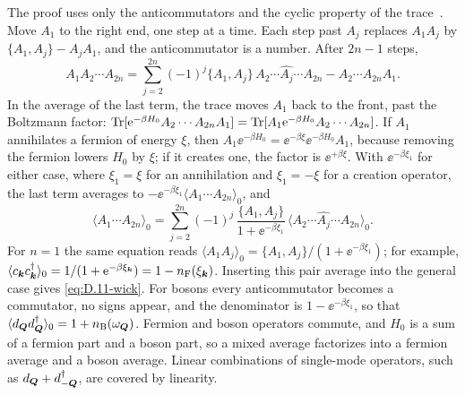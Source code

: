 The proof uses only the anticommutators and the cyclic property of the trace~\cite{gaudin1960demonstration}. Move $A_1$ to the right end, one step at a time. Each step past $A_j$ replaces $A_1A_j$ by $\{A_1, A_j\} - A_jA_1$, and the anticommutator is a number. After $2n - 1$ steps,
\begin{equation*}
  A_1A_2\cdots A_{2n} = \sum_{j=2}^{2n}(-1)^j\{A_1, A_j\}\,A_2\cdots\widehat{A_j}\cdots A_{2n} - A_2\cdots A_{2n}A_1 .
\end{equation*}
In the average of the last term, the trace moves $A_1$ back to the front, past the Boltzmann factor: $\operatorname{Tr}[\mathrm{e}^{-\beta H_0}A_2\cdots A_{2n}A_1] = \operatorname{Tr}[A_1\mathrm{e}^{-\beta H_0}A_2\cdots A_{2n}]$. If $A_1$ annihilates a fermion of energy $\xi$, then $A_1\ee^{-\beta H_0} = \ee^{-\beta\xi}\ee^{-\beta H_0}A_1$, because removing the fermion lowers $H_0$ by $\xi$; if it creates one, the factor is $\ee^{+\beta\xi}$. With $\ee^{-\beta\xi_1}$ for either case, where $\xi_1 = \xi$ for an annihilation and $\xi_1 = -\xi$ for a creation operator, the last term averages to $-\ee^{-\beta\xi_1}\langle A_1\cdots A_{2n}\rangle_0$, and
\begin{equation*}
  \langle A_1\cdots A_{2n}\rangle_0 = \sum_{j=2}^{2n}(-1)^j\,\frac{\{A_1, A_j\}}{1 + \ee^{-\beta\xi_1}}\,\langle A_2\cdots\widehat{A_j}\cdots A_{2n}\rangle_0 .
\end{equation*}
For $n = 1$ the same equation reads $\langle A_1A_j\rangle_0 = \{A_1, A_j\}/(1 + \ee^{-\beta\xi_1})$; for example, $\langle c_{\bm{k}}c^\dagger_{\bm{k}}\rangle_0 = 1/(1 + \mathrm{e}^{-\beta\xi_{\bm{k}}}) = 1 - n_{\mathrm{F}}(\xi_{\bm{k}})$. Inserting this pair average into the general case gives \cref{eq:D.11-wick}. For bosons every anticommutator becomes a commutator, no signs appear, and the denominator is $1 - \ee^{-\beta\xi_1}$, so that $\langle d_{\bm{Q}}d^\dagger_{\bm{Q}}\rangle_0 = 1 + n_{\mathrm{B}}(\omega_{\bm{Q}})$. Fermion and boson operators commute, and $H_0$ is a sum of a fermion part and a boson part, so a mixed average factorizes into a fermion average and a boson average. Linear combinations of single-mode operators, such as $d_{\bm{Q}} + d^\dagger_{-\bm{Q}}$, are covered by linearity.

